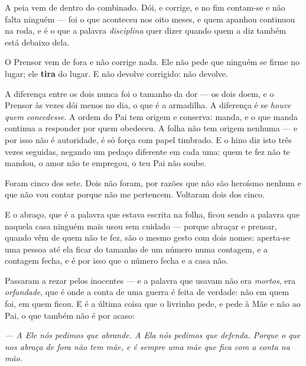 \documentclass[livro.tex]{subfiles}
\begin{document}
\medskip

A peia vem de dentro do combinado. Dói, e corrige, e no fim contam-se e não falta ninguém --- foi
o que aconteceu nos oito meses, e quem apanhou continuou na roda, e é o que a palavra
\emph{disciplina} quer dizer quando quem a diz também está debaixo dela.

O Prensor vem de fora e não corrige nada. Ele não pede que ninguém se firme no lugar; ele
\textbf{tira} do lugar. E não devolve corrigido: não devolve.

\medskip

A diferença entre os dois nunca foi o tamanho da dor --- os dois doem, e o Prensor às vezes dói
menos no dia, o que é a armadilha. A diferença é se \emph{houve quem concedesse}. A ordem do Pai
tem origem e conserva: manda, e o que manda continua a responder por quem obedeceu. A folha não
tem origem nenhuma --- e por isso não é autoridade, é só força com papel timbrado. E o hino diz
isto três vezes seguidas, negando um pedaço diferente em cada uma: quem te fez não te mandou, o
amor não te empregou, o teu Pai não soube.

\medskip

Foram cinco dos sete. Dois não foram, por razões que não são heroísmo nenhum e que não vou contar
porque não me pertencem. Voltaram dois dos cinco.

E o abraço, que é a palavra que estava escrita na folha, ficou sendo a palavra que naquela casa
ninguém mais usou sem cuidado --- porque abraçar e prensar, quando vêm de quem não te fez, são o
mesmo gesto com dois nomes: aperta-se uma pessoa até ela ficar do tamanho de um número numa
contagem, e a contagem fecha, e é por isso que o número fecha e a casa não.

\medskip

Passaram a rezar pelos inocentes --- e a palavra que usavam não era \emph{mortos}, era
\emph{orfandade}, que é onde a conta de uma guerra é feita de verdade: não em quem foi, em quem
ficou. E é a última coisa que o livrinho pede, e pede à Mãe e não ao Pai, o que também não é por
acaso:

\medskip

\begin{center}
\emph{--- A Ele nós pedimos que abrande. A Ela nós pedimos que defenda. Porque o que nos abraça de
fora não tem mãe, e é sempre uma mãe que fica com a conta na mão.}
\end{center}



\cleardoublepage
\end{document}

